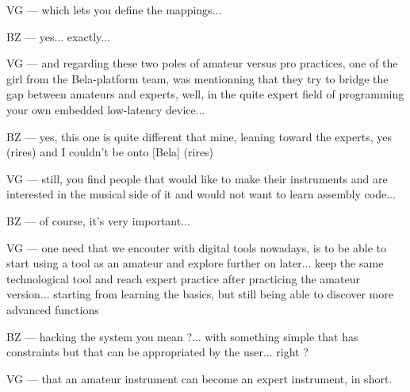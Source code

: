 VG — which lets you define the mappings...

BZ — yes... exactly...

VG — and regarding these two poles of amateur versus pro practices, one of the girl from the Bela-platform team, was mentionning that they try to bridge the gap between amateurs and experts, well, in the quite expert field of programming your own embedded low-latency device...

BZ — yes, this one is quite different that mine, leaning toward the experts, yes (rires) and I couldn't be onto [Bela] (rires)

VG —  still, you find people that would like to make their instruments and are interested in the musical side of it and would not want to learn assembly code... 

BZ — of course, it's very important...

VG — one need that we encouter with digital tools nowadays, is to be able to start using a tool as an amateur and explore further on later... keep the same technological tool and reach expert practice after practicing the amateur version... starting from learning the basics, but still being able to discover more advanced functions 

BZ — hacking the system you mean ?... with something simple that has constraints but that can be appropriated by the user... right ?

VG — that an amateur instrument can become an expert instrument, in short.

